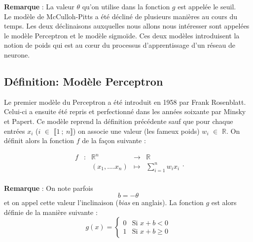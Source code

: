 \documentclass{article}
\newcommand{\fonction}[5]{
    \begin{array}{ccccc}
#1 & : & #2 & \to & #3\\
    & & #4 & \mapsto & #5\\ 
    \end{array}
}
\begin{document}
\textbf{Remarque} : La valeur $\theta$  qu'on utilise dans la fonction $g$ est appelée le seuil.\\
	

Le modèle de McCulloh-Pitts a été décliné de plusieurs manières au cours du temps. Les deux déclinaisons auxquelles nous allons nous intéresser sont appelées le modèle Perceptron et le modèle sigmoïde. Ces deux modèles introduisent la notion de poids qui est au cœur du processus d'apprentissage d'un réseau de neurone. 

\subsection{Définition: Modèle Perceptron}
		Le premier modèle du Perceptron a été introduit en 1958 par Frank Rosenblatt. Celui-ci a ensuite été repris et perfectionné dans les années soixante par Minsky et Papert. Ce modèle reprend la définition précédente sauf que pour chaque entrées $x_i$ ($i$ $\in$ $\llbracket 1~;~n \rrbracket$) on associe une valeur (les fameux poids) $w_i$ $\in$ $\mathbb{R}$. 
		On définit alors la fonction $f$ de la façon suivante : 
		
		\[\fonction{f}{\mathbb{R}^n}{\mathbb{R}}{(x_1,....x_n)}{\sum_{i=1}^{n} {w_ix_i}}. \]

	
	\textbf{Remarque} : On note parfois \[b = -\theta \]  et on appel cette valeur l'inclinaison (\textit{bias} en anglais). La fonction $g$ est alors définie de la manière suivante :   
		\[g(x) = \begin{cases} 0 &\mbox{Si } x + b < 0 \\
				 1 & \mbox{Si } x + b \geq 0
	 		 \end{cases} \] \\
\vfill
\begin{center}
\end{center}
\vfill
	 
\end{document}
